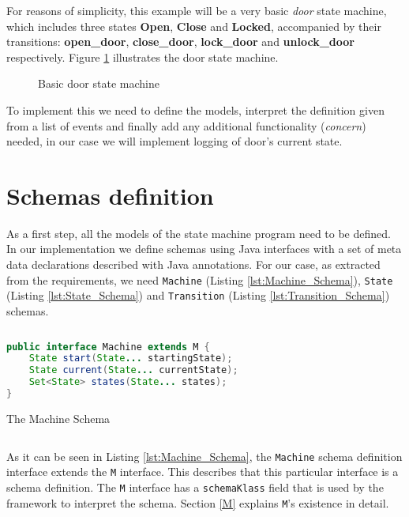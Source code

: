 For reasons of simplicity, this example will be a very basic \textit{door} state machine, which includes three states \textbf{Open}, \textbf{Close} and \textbf{Locked}, accompanied by their transitions: \textbf{open\_door}, \textbf{close\_door}, \textbf{lock\_door} and \textbf{unlock\_door} respectively.
Figure \ref{fig:State_machine} illustrates the door state machine.

\begin{figure}[H]
	\centering
  	\caption{Basic door state machine}
  	\label{fig:State_machine}
\end{figure}

To implement this we need to define the models, interpret the definition given from a list of events and finally add any additional functionality (\textit{concern}) needed, in our case we will implement logging of door's current state.

\section{Schemas definition}
As a first step, all the models of the state machine program need to be defined. 
In our implementation we define schemas using Java interfaces with a set of meta data declarations described with Java annotations.
For our case, as extracted from the requirements, we need \texttt{Machine} (Listing \ref{lst:Machine_Schema}), \texttt{State} (Listing \ref{lst:State_Schema}) and \texttt{Transition} (Listing \ref{lst:Transition_Schema}) schemas.

\begin{sourcecode}[H]
	\begin{lstlisting}[language=Java,escapechar=|]
public interface Machine extends M {
	State start(State... startingState);
	State current(State... currentState);
	Set<State> states(State... states);
}
	\end{lstlisting}
	\caption{The Machine Schema}
	\label{lst:Machine_Schema}
\end{sourcecode}

As it can be seen in Listing \ref{lst:Machine_Schema}, the \texttt{Machine} schema definition interface extends the \texttt{M} interface.
This describes that this particular interface is a schema definition.
The \texttt{M} interface has a \texttt{schemaKlass} field that is used by the framework to interpret the schema.
Section \ref{M} explains \texttt{M}'s existence in detail.

